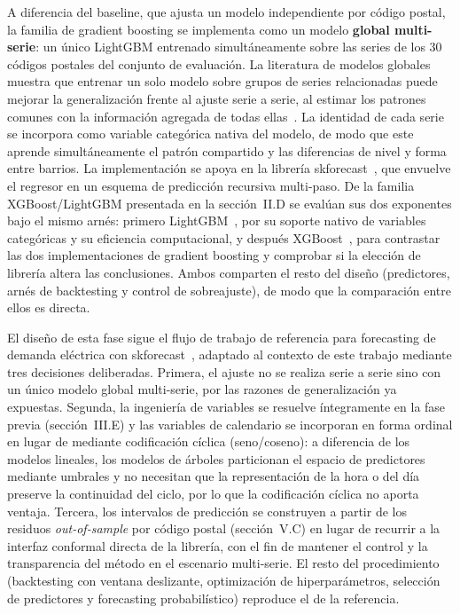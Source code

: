 \documentclass[12pt, a4paper]{article}
\begin{document}
A diferencia del baseline, que ajusta un modelo independiente por código postal, la familia de gradient boosting se implementa como un modelo \textbf{global multi-serie}: un único LightGBM entrenado simultáneamente sobre las series de los 30 códigos postales del conjunto de evaluación. La literatura de modelos globales muestra que entrenar un solo modelo sobre grupos de series relacionadas puede mejorar la generalización frente al ajuste serie a serie, al estimar los patrones comunes con la información agregada de todas ellas~\cite{montero2021}. La identidad de cada serie se incorpora como variable categórica nativa del modelo, de modo que este aprende simultáneamente el patrón compartido y las diferencias de nivel y forma entre barrios. La implementación se apoya en la librería skforecast~\cite{skforecast}, que envuelve el regresor en un esquema de predicción recursiva multi-paso. De la familia XGBoost/LightGBM presentada en la sección~II.D se evalúan sus dos exponentes bajo el mismo arnés: primero LightGBM~\cite{ke2017}, por su soporte nativo de variables categóricas y su eficiencia computacional, y después XGBoost~\cite{chen2016}, para contrastar las dos implementaciones de gradient boosting y comprobar si la elección de librería altera las conclusiones. Ambos comparten el resto del diseño (predictores, arnés de backtesting y control de sobreajuste), de modo que la comparación entre ellos es directa.

El diseño de esta fase sigue el flujo de trabajo de referencia para forecasting de demanda eléctrica con skforecast~\cite{skforecast}, adaptado al contexto de este trabajo mediante tres decisiones deliberadas. Primera, el ajuste no se realiza serie a serie sino con un único modelo global multi-serie, por las razones de generalización ya expuestas. Segunda, la ingeniería de variables se resuelve íntegramente en la fase previa (sección~III.E) y las variables de calendario se incorporan en forma ordinal en lugar de mediante codificación cíclica (seno/coseno): a diferencia de los modelos lineales, los modelos de árboles particionan el espacio de predictores mediante umbrales y no necesitan que la representación de la hora o del día preserve la continuidad del ciclo, por lo que la codificación cíclica no aporta ventaja. Tercera, los intervalos de predicción se construyen a partir de los residuos \textit{out-of-sample} por código postal (sección~V.C) en lugar de recurrir a la interfaz conformal directa de la librería, con el fin de mantener el control y la transparencia del método en el escenario multi-serie. El resto del procedimiento (backtesting con ventana deslizante, optimización de hiperparámetros, selección de predictores y forecasting probabilístico) reproduce el de la referencia.
\end{document}
